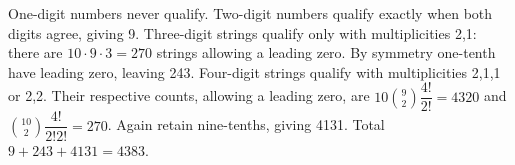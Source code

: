 One-digit numbers never qualify. Two-digit numbers qualify exactly when both digits agree, giving 9. Three-digit strings qualify only with multiplicities 2,1: there are $10\cdot 9\cdot 3=270$ strings allowing a leading zero. By symmetry one-tenth have leading zero, leaving 243. Four-digit strings qualify with multiplicities 2,1,1 or 2,2. Their respective counts, allowing a leading zero, are $10\binom 92\dfrac{4!}{2!}=4320$ and $\binom{10}2\dfrac{4!}{2!2!}=270$. Again retain nine-tenths, giving 4131. Total $9+243+4131=\boxed{4383}$.
